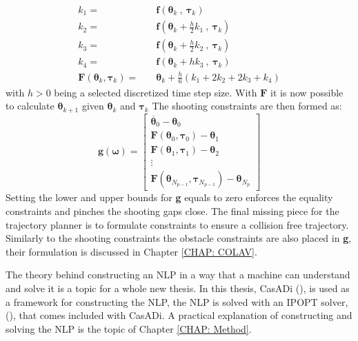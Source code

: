 \begin{equation}
    \label{EQ: RK4}
    \begin{split}
    k_1 = \quad & \textbf{f}(\bm{\theta}_{k} \ , \ \bm{\tau}_k) \\
    k_2 = \quad & \textbf{f}(\bm{\theta}_{k} + \frac{h}{2}k_1 \ , \ \bm{\tau}_k) \\
    k_3 = \quad & \textbf{f}(\bm{\theta}_{k} + \frac{h}{2}k_2 \ , \ \bm{\tau}_k) \\ 
    k_4 = \quad & \textbf{f}(\bm{\theta}_{k} + h k_3 \ , \ \bm{\tau}_k) \\ 
    \textbf{F}(\bm{\theta}_{k}, \bm{\tau}_k) = \quad & \bm{\theta}_k + \frac{h}{6} (k_1 + 2k_2 + 2k_3 + k_4)
    \end{split}
\end{equation}
with $h>0$ being a selected discretized time step size. With $\textbf{F}$ it is now possible to calculate $\bm{\theta}_{k+1}$ given $\bm{\theta}_k$ and $\bm{\tau}_k$
The shooting constraints are then formed as:
\begin{equation}
    \textbf{g}(\bm{\omega}) = \begin{bmatrix}
                            \overline{\bm{\theta}}_0 - \bm{\theta}_0 \\
                            \textbf{F}(\bm{\theta}_{0}, \bm{\tau}_0) - \bm{\theta}_1 \\
                            \textbf{F}(\bm{\theta}_{1}, \bm{\tau}_1) - \bm{\theta}_2 \\
                            \vdots \\
                            \textbf{F}(\bm{\theta}_{N_{p-1}}, \bm{\tau}_{N_{p-1}}) - \bm{\theta}_{N_{p}}
                             \end{bmatrix}
\end{equation}
Setting the lower and upper bounds for \textbf{g} equals to zero enforces the equality constraints and pinches the shooting gaps close. The final missing piece for the trajectory planner
is to formulate constraints to ensure a collision free trajectory. Similarly to the shooting constraints the obstacle constraints are also placed in \textbf{g}, their
formulation is discussed in Chapter \ref{CHAP: COLAV}.

The theory behind constructing an \gls{NLP} in a way that a machine can understand and solve it is a topic for a whole new thesis. In this thesis, CasADi (\cite{andersson2019casadi}), is used
as a framework for constructing the NLP, the NLP is solved with an \gls{IPOPT} solver, (\cite{wachter2006implementation}), that comes included with CasADi. A practical
explanation of constructing and solving the NLP is the topic of Chapter \ref{CHAP: Method}.

